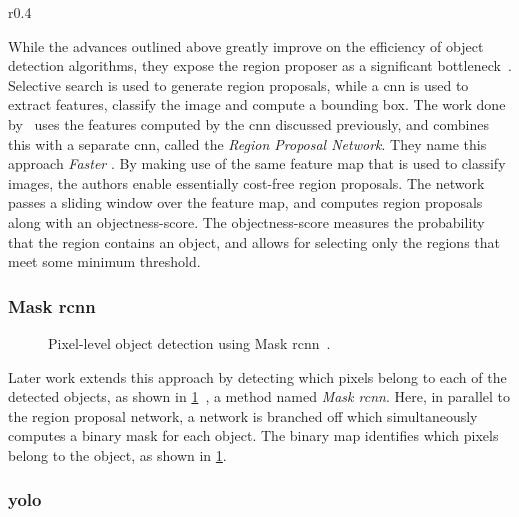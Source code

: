 \documentclass[\rootfolder/main.tex]{subfiles}
\begin{document}
\begin{wrapfigure}{r}{0.4\columnwidth}
    \caption[Object detection using Faster \acrshort{rcnn}.]{Object detection using \acrshort{rcnn}~\cite{Ren2017}.}
    \label{fig:faster-rcnn}
\end{wrapfigure}

While the advances outlined above greatly improve on the efficiency of object detection algorithms, they expose the region proposer as a significant bottleneck~\cite{Ren2017}.
Selective search is used to generate region proposals, while a \acrshort{cnn} is used to extract features, classify the image and compute a bounding box.
The work done by~\cite{Ren2017} uses the features computed by the \acrshort{cnn} discussed previously, and combines this with a separate \acrshort{cnn}, called the \emph{Region Proposal Network}.
They name this approach \emph{Faster }.
By making use of the same feature map that is used to classify images, the authors enable essentially cost-free region proposals.
The network passes a sliding window over the feature map, and computes region proposals along with an objectness-score.
The objectness-score measures the probability that the region contains an object, and allows for selecting only the regions that meet some minimum threshold.

\subsubsection{Mask \acrshort{rcnn}}

\begin{figure}[H]
    \caption[Pixel-level object detection using Mask \acrshort{rcnn}.]{Pixel-level object detection using Mask \acrshort{rcnn}~\cite{He2017}.}
    \label{fig:mask-rcnn}
\end{figure}

Later work extends this approach by detecting which pixels belong to each of the detected objects, as shown in \cref{fig:mask-rcnn}~\cite{He2017}, a method named \emph{Mask \acrshort{rcnn}}.
Here, in parallel to the region proposal network, a network is branched off which simultaneously computes a binary mask for each object.
The binary map identifies which pixels belong to the object, as shown in \cref{fig:mask-rcnn}.

\subsubsection{\acrfull{yolo}}
\end{document}
